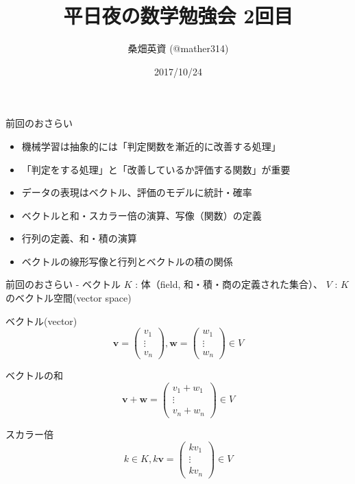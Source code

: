 \documentclass[dvipdfmx,12pt,a4paper,handout]{beamer}
\title{平日夜の数学勉強会 2回目}
\author{桑畑英資 (@mather314)}
\date{2017/10/24}
\begin{document}
\frame{\maketitle}

\begin{frame}{前回のおさらい}
 \begin{itemize}
  \item 機械学習は抽象的には「判定関数を漸近的に改善する処理」
  \item 「判定をする処理」と「改善しているか評価する関数」が重要
  \item データの表現はベクトル、評価のモデルに統計・確率
  \item ベクトルと和・スカラー倍の演算、写像（関数）の定義
  \item 行列の定義、和・積の演算
  \item ベクトルの線形写像と行列とベクトルの積の関係
 \end{itemize}
\end{frame}

\begin{frame}{前回のおさらい - ベクトル}
 $K$ : 体（field, 和・積・商の定義された集合）、 $V$ : $K$ のベクトル空間(vector space)

 ベクトル(vector)
 \[
  \bm{v} =
  \begin{pmatrix}
   v_1 \\
   \vdots \\
   v_n
  \end{pmatrix},
 \bm{w} =
  \begin{pmatrix}
   w_1 \\
   \vdots \\
   w_n
  \end{pmatrix}
  \in V
 \]


 \begin{block}{ベクトルの和}
  \[
  \bm{v} + \bm{w} =
  \begin{pmatrix}
   v_1 + w_1 \\
   \vdots \\
   v_n + w_n
  \end{pmatrix}
  \in V
  \]
 \end{block}


 \begin{block}{スカラー倍}
  \[
  k \in K,
  k \bm{v} =
  \begin{pmatrix}
   k v_1 \\
   \vdots \\
   k v_n
  \end{pmatrix}
  \in V
  \]
 \end{block}

\end{frame}
\end{document}
